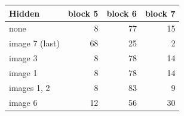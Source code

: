 \begin{tabular}{lrrr}
\toprule
Hidden & block 5 & block 6 & block 7 \\
\midrule
none & 8 & 77 & 15 \\
image 7 (last) & 68 & 25 & 2 \\
image 3 & 8 & 78 & 14 \\
image 1 & 8 & 78 & 14 \\
images 1, 2 & 8 & 83 & 9 \\
image 6 & 12 & 56 & 30 \\
\bottomrule
\end{tabular}
